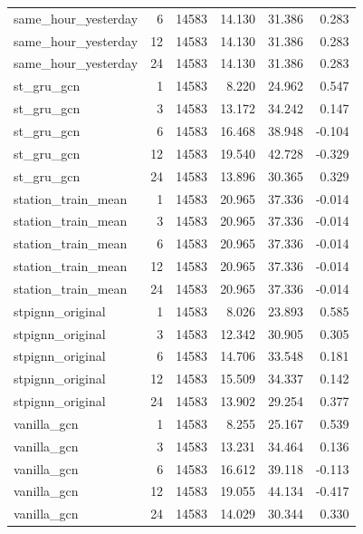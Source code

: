\begin{table}[t]
\begin{tabular}{lrrrrr}
same\_hour\_yesterday & 6 & 14583 & 14.130 & 31.386 & 0.283 \\
same\_hour\_yesterday & 12 & 14583 & 14.130 & 31.386 & 0.283 \\
same\_hour\_yesterday & 24 & 14583 & 14.130 & 31.386 & 0.283 \\
st\_gru\_gcn & 1 & 14583 & 8.220 & 24.962 & 0.547 \\
st\_gru\_gcn & 3 & 14583 & 13.172 & 34.242 & 0.147 \\
st\_gru\_gcn & 6 & 14583 & 16.468 & 38.948 & -0.104 \\
st\_gru\_gcn & 12 & 14583 & 19.540 & 42.728 & -0.329 \\
st\_gru\_gcn & 24 & 14583 & 13.896 & 30.365 & 0.329 \\
station\_train\_mean & 1 & 14583 & 20.965 & 37.336 & -0.014 \\
station\_train\_mean & 3 & 14583 & 20.965 & 37.336 & -0.014 \\
station\_train\_mean & 6 & 14583 & 20.965 & 37.336 & -0.014 \\
station\_train\_mean & 12 & 14583 & 20.965 & 37.336 & -0.014 \\
station\_train\_mean & 24 & 14583 & 20.965 & 37.336 & -0.014 \\
stpignn\_original & 1 & 14583 & 8.026 & 23.893 & 0.585 \\
stpignn\_original & 3 & 14583 & 12.342 & 30.905 & 0.305 \\
stpignn\_original & 6 & 14583 & 14.706 & 33.548 & 0.181 \\
stpignn\_original & 12 & 14583 & 15.509 & 34.337 & 0.142 \\
stpignn\_original & 24 & 14583 & 13.902 & 29.254 & 0.377 \\
vanilla\_gcn & 1 & 14583 & 8.255 & 25.167 & 0.539 \\
vanilla\_gcn & 3 & 14583 & 13.231 & 34.464 & 0.136 \\
vanilla\_gcn & 6 & 14583 & 16.612 & 39.118 & -0.113 \\
vanilla\_gcn & 12 & 14583 & 19.055 & 44.134 & -0.417 \\
vanilla\_gcn & 24 & 14583 & 14.029 & 30.344 & 0.330 \\
\hline
\end{tabular}
\end{table}
